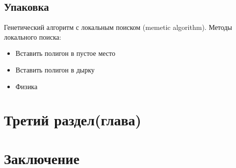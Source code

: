 \documentclass{fefu_thesis/cls/fefu}
\begin{document}
    \subsection{Упаковка}
    Генетический алгоритм с локальным поиском (memetic algorithm). Методы локального поиска:
    \begin{itemize}
        \item Вставить полигон в пустое место
        \item Вставить полигон в дырку
        \item Физика
    \end{itemize}
    \section{Третий раздел(глава)}
    \section{Заключение}
    \newpage
    
    
\end{document}
